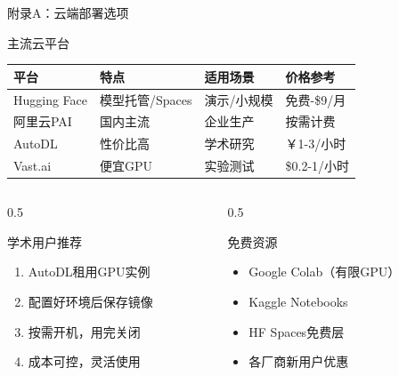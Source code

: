 \documentclass[aspectratio=169,11pt]{beamer}
\begin{document}
\begin{frame}{附录A：云端部署选项}
    \begin{block}{主流云平台}
        \small
        \begin{tabular}{llll}
            \toprule
            \textbf{平台} & \textbf{特点} & \textbf{适用场景} & \textbf{价格参考} \\
            \midrule
            Hugging Face & 模型托管/Spaces & 演示/小规模 & 免费-\$9/月 \\
            阿里云PAI & 国内主流 & 企业生产 & 按需计费 \\
            AutoDL & 性价比高 & 学术研究 & ￥1-3/小时 \\
            Vast.ai & 便宜GPU & 实验测试 & \$0.2-1/小时 \\
            \bottomrule
        \end{tabular}
    \end{block}
    
    \vspace{0.3cm}
    \begin{columns}
        \begin{column}{0.5\textwidth}
            \begin{alertblock}{学术用户推荐}
                \begin{enumerate}
                    \item AutoDL租用GPU实例
                    \item 配置好环境后保存镜像
                    \item 按需开机，用完关闭
                    \item 成本可控，灵活使用
                \end{enumerate}
            \end{alertblock}
        \end{column}
        \begin{column}{0.5\textwidth}
            \begin{exampleblock}{免费资源}
                \begin{itemize}
                    \item Google Colab（有限GPU）
                    \item Kaggle Notebooks
                    \item HF Spaces免费层
                    \item 各厂商新用户优惠
                \end{itemize}
            \end{exampleblock}
        \end{column}
    \end{columns}
\end{frame}
\end{document}
